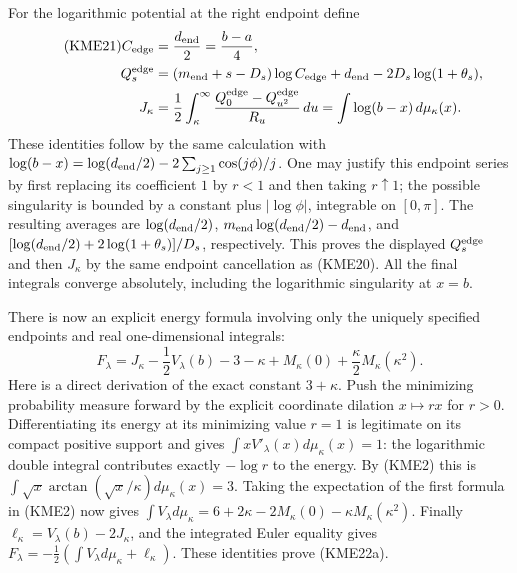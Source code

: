 For the logarithmic potential at the right endpoint define
\begin{align}\tag{KME21}
 C_{\rm edge}&=\frac{d_{\rm end}}2=\frac{b-a}{4},\\
 Q_s^{\rm edge}&=(m_{\rm end}+s-D_s)\log C_{\rm edge}
                            +d_{\rm end}-2D_s\log(1+\theta_s),\notag\\
 J_\kappa&=\frac12\int_\kappa^\infty
                  \frac{Q_0^{\rm edge}-Q_{u^2}^{\rm edge}}{R_u}\,du
       =\int\log(b-x)\,d\mu_\kappa(x).\notag
\end{align}
These identities follow by the same calculation with
$\log(b-x)=\log(d_{\rm end}/2)-2\sum_{j\geq1}\cos(j\phi)/j$.
One may justify this endpoint series by first replacing its coefficient
$1$ by $r<1$ and then taking $r\uparrow1$; the possible singularity is
bounded by a constant plus $|\log\phi|$, integrable on $[0,\pi]$.
The resulting averages are $\log(d_{\rm end}/2)$, $m_{\rm end}\log(d_{\rm end}/2)-d_{\rm end}$, and
$[\log(d_{\rm end}/2)+2\log(1+\theta_s)]/D_s$, respectively.
This proves the displayed $Q_s^{\rm edge}$ and then $J_\kappa$ by the
same endpoint cancellation as (KME20). All the final integrals converge
absolutely, including the logarithmic singularity at $x=b$.

There is now an explicit energy formula involving only the uniquely
specified endpoints and real one-dimensional integrals:
\begin{equation}\tag{KME22a}
 \boxed{F_\lambda=J_\kappa-\frac12V_\lambda(b)-3-\kappa
                       +M_\kappa(0)+\frac \kappa2M_\kappa(\kappa^2).}
\end{equation}
Here is a direct derivation of the exact constant $3+\kappa$.
Push the minimizing probability measure forward by the explicit
coordinate dilation $x\mapsto r x$ for $r>0$. Differentiating its energy
at its minimizing value $r=1$ is legitimate on its compact positive
support and gives $\int xV'_\lambda(x)d\mu_\kappa(x)=1$: the logarithmic
double integral contributes exactly $-\log r$ to the energy.
By (KME2) this is
$\int\sqrt x\arctan(\sqrt x/\kappa)d\mu_\kappa(x)=3$.
Taking the expectation of the first formula in (KME2) now gives
$\int V_\lambda d\mu_\kappa=6+2\kappa-2M_\kappa(0)-\kappa M_\kappa(\kappa^2)$.
Finally $\ell_\kappa=V_\lambda(b)-2J_\kappa$, and the integrated Euler equality
gives $F_\lambda=-\tfrac12(\int V_\lambda d\mu_\kappa+\ell_\kappa)$.
These identities prove (KME22a).

